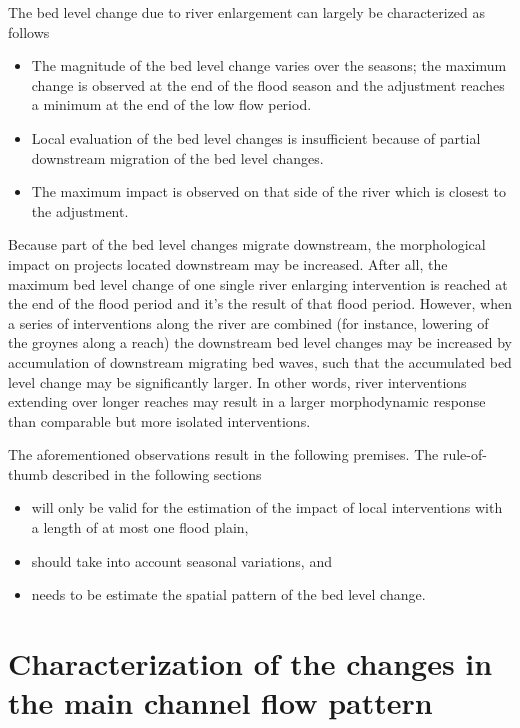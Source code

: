 The bed level change due to river enlargement can largely be characterized as follows

\begin{itemize}
\item The magnitude of the bed level change varies over the seasons; the maximum change is observed at the end of the flood season and the adjustment reaches a minimum at the end of the low flow period.

\item Local evaluation of the bed level changes is insufficient because of partial downstream migration of the bed level changes.

\item The maximum impact is observed on that side of the river which is closest to the adjustment.
\end{itemize}

Because part of the bed level changes migrate downstream, the morphological impact on projects located downstream may be increased.
After all, the maximum bed level change of one single river enlarging intervention is reached at the end of the flood period and it's the result of that flood period.
However, when a series of interventions along the river are combined (for instance, lowering of the groynes along a reach) the downstream bed level changes may be increased by accumulation of downstream migrating bed waves, such that the accumulated bed level change may be significantly larger.
In other words, river interventions extending over longer reaches may result in a larger morphodynamic response than comparable but more isolated interventions.

The aforementioned observations result in the following premises.
The rule-of-thumb described in the following sections

\begin{itemize}
\item will only be valid for the estimation of the impact of local interventions with a length of at most one flood plain,

\item should take into account seasonal variations, and

\item needs to be estimate the spatial pattern of the bed level change.
\end{itemize}


\section{Characterization of the changes in the main channel flow pattern}

